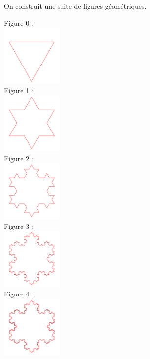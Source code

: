 \documentclass[a4paper,11pt,exos]{nsi} %
\begin{document}
\maketitle
On construit une suite de figures géométriques.

\begin{multicols}{5}
    Figure 0 :\\
    \includegraphics[width=3cm]{Von_Koch0.png}\\
    \vfill\null
    \columnbreak
    Figure 1 :\\
    \includegraphics[width=3cm]{Von_Koch1.png}\\
    \vfill\null
    \columnbreak
    Figure 2 :\\
    \includegraphics[width=3cm]{Von_Koch2.png}\\
    \vfill\null
    \columnbreak
    Figure 3 :\\
    \includegraphics[width=3cm]{Von_Koch3.png}\\
    \vfill\null
    \columnbreak
    Figure 4 :\\
    \includegraphics[width=3cm]{Von_Koch4.png}
\end{multicols}
\end{document}
